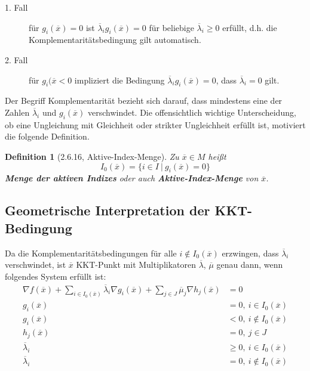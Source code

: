 \documentclass[12pt]{extreport} %
\theoremstyle{named}
\theoremstyle{nnamed}
\theoremstyle{itshape}
\newtheorem*{definition}{Definition}
\theoremstyle{normal}
\begin{document}
\begin{description}
	\item[1. Fall] für $g_i(\overline{x}) = 0$ ist $\overline{\lambda}_i g_i(\overline{x}) = 0$ für beliebige $\overline{\lambda}_i \geq 0$ erfüllt, d.h. die Komplementaritätsbedingung gilt automatisch.
	\item[2. Fall] für $g_i(\overline{x} < 0$ impliziert die Bedingung $\overline{\lambda}_i g_i(\overline{x}) = 0$, dass $\overline{\lambda}_i = 0$ gilt.
\end{description}	

Der Begriff Komplementarität bezieht sich darauf, dass mindestens eine der Zahlen $\overline{\lambda}_i$ und $g_i(\overline{x})$ verschwindet. Die offensichtlich wichtige Unterscheidung, ob eine Ungleichung mit Gleichheit oder strikter Ungleichheit erfüllt ist, motiviert die folgende Definition.

\begin{definition}[2.6.16, Aktive-Index-Menge]
	Zu $\overline{x} \in M$ heißt
	$$ I_0(\overline{x}) = \big\{ i \in I ~|~g_i(\overline{x}) = 0 \big\} $$	
	\textbf{Menge der aktiven Indizes} oder auch \textbf{Aktive-Index-Menge} von $\overline{x}$.
\end{definition}
	
\subsection*{Geometrische Interpretation der KKT-Bedingung}

Da die Komplementaritätsbedingungen für alle $i \notin I_0(\overline{x})$ erzwingen, dass $\overline{\lambda}_i$ verschwindet, ist $\overline{x}$ KKT-Punkt mit Multiplikatoren $\overline{\lambda}$, $\overline{\mu}$ genau dann, wenn folgendes System erfüllt ist:
	\begin{align*}
		\nabla f(\overline{x}) + \sum_{i \in I_0(\overline{x})} \overline{\lambda}_i \nabla g_i(\overline{x}) + \sum_{j \in J} \overline{\mu}_j \nabla h_j(\overline{x}) & = 0 \\
		g_i(\overline{x}) & = 0, ~i \in I_0(\overline{x}) \\
		g_i(\overline{x}) & < 0, ~i \notin I_0(\overline{x}) \\
		h_j(\overline{x}) & = 0, ~j \in J \\
		\overline{\lambda}_i & \geq 0, ~i \in I_0(\overline{x}) \\
		\overline{\lambda}_i & = 0, ~ i \notin I_0(\overline{x})
	\end{align*}	
	
\end{document}
